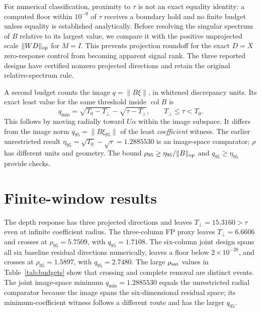 \documentclass[aps,prd,reprint,onecolumn,superscriptaddress,nofootinbib]{revtex4-2}
\begin{document}
For numerical classification, proximity to $\tau$ is not an exact equality identity: a computed floor within $10^{-9}$ of $\tau$ receives a boundary hold and no finite budget unless equality is established analytically. Before resolving the singular spectrum of $B$ relative to its largest value, we compare it with the positive unprojected scale $\|WD\|_{\rm op}$ for $M=I$. This prevents projection roundoff for the exact $D=X$ zero-response control from becoming apparent signal rank. The three reported designs have certified nonzero projected directions and retain the original relative-spectrum rule.

A second budget counts the image $q=\|B\xi\|$, in whitened discrepancy units. Its exact least value for the same threshold inside $\operatorname{col}B$ is
\begin{equation}
 q_{\min}=\sqrt{T_0-T_\perp}-\sqrt{\tau-T_\perp},\qquad T_\perp\leq\tau<T_0.\label{eq:qmin}
\end{equation}
This follows by moving radially toward $U\alpha$ within the image subspace. It differs from the image norm $q_{95}=\|B\xi_{95}\|$ of the least \emph{coefficient} witness. The earlier unrestricted result $\eta_{95}=\sqrt{T_0}-\sqrt\tau=1.2885530$ is an image-space comparator; $\rho$ has different units and geometry. The bound $\rho_{95}\geq\eta_{95}/\|B\|_{\rm op}$ and $q_{95}\geq\eta_{95}$ provide checks.

\section{Finite-window results}


The depth response has three projected directions and leaves $T_\perp=15.3160>\tau$ even at infinite coefficient radius. The three-column FP proxy leaves $T_\perp=6.6606$ and crosses at $\rho_{95}=5.7509$, with $q_{95}=1.7108$. The six-column joint design spans all six baseline residual directions numerically, leaves a floor below $2\times10^{-28}$, and crosses at $\rho_{95}=1.5897$, with $q_{95}=2.7480$. The large $\rho_{\rm sat}$ values in Table~\ref{tab:budgets} show that crossing and complete removal are distinct events. The joint image-space minimum $q_{\min}=1.2885530$ equals the unrestricted radial comparator because the image spans the six-dimensional residual space; its minimum-coefficient witness follows a different route and has the larger $q_{95}$.
\end{document}
